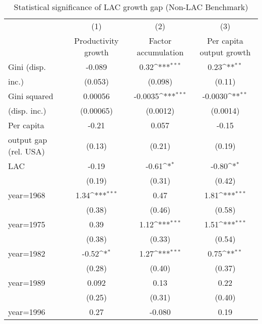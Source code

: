 \begin{sidewaystable}[htbp]\centering
\def\sym#1{\ifmmode^{#1}\else\(^{#1}\)\fi}
\caption{Statistical significance of LAC growth gap (Non-LAC Benchmark)}
\begin{tabular}{l*{3}{c}}
\toprule
                &\multicolumn{1}{c}{(1)}&\multicolumn{1}{c}{(2)}&\multicolumn{1}{c}{(3)}\\
                &\multicolumn{1}{c}{Productivity growth}&\multicolumn{1}{c}{Factor accumulation}&\multicolumn{1}{c}{Per capita output growth}\\
\midrule
Gini (disp.     &   -0.089         &     0.32\sym{***}&     0.23\sym{**} \\
inc.)           &  (0.053)         &  (0.098)         &   (0.11)         \\
\addlinespace
Gini squared    &  0.00056         &  -0.0035\sym{***}&  -0.0030\sym{**} \\
(disp. inc.)    &(0.00065)         & (0.0012)         & (0.0014)         \\
\addlinespace
Per capita      &    -0.21         &    0.057         &    -0.15         \\
output gap (rel. USA)&   (0.13)         &   (0.21)         &   (0.19)         \\
\addlinespace
LAC             &    -0.19         &    -0.61\sym{*}  &    -0.80\sym{*}  \\
                &   (0.19)         &   (0.31)         &   (0.42)         \\
\addlinespace
year=1968       &     1.34\sym{***}&     0.47         &     1.81\sym{***}\\
                &   (0.38)         &   (0.46)         &   (0.58)         \\
\addlinespace
year=1975       &     0.39         &     1.12\sym{***}&     1.51\sym{***}\\
                &   (0.38)         &   (0.33)         &   (0.54)         \\
\addlinespace
year=1982       &    -0.52\sym{*}  &     1.27\sym{***}&     0.75\sym{**} \\
                &   (0.28)         &   (0.40)         &   (0.37)         \\
\addlinespace
year=1989       &    0.092         &     0.13         &     0.22         \\
                &   (0.25)         &   (0.31)         &   (0.40)         \\
\addlinespace
year=1996       &     0.27         &   -0.080         &     0.19         \\

\end{tabular}
\end{sidewaystable}
